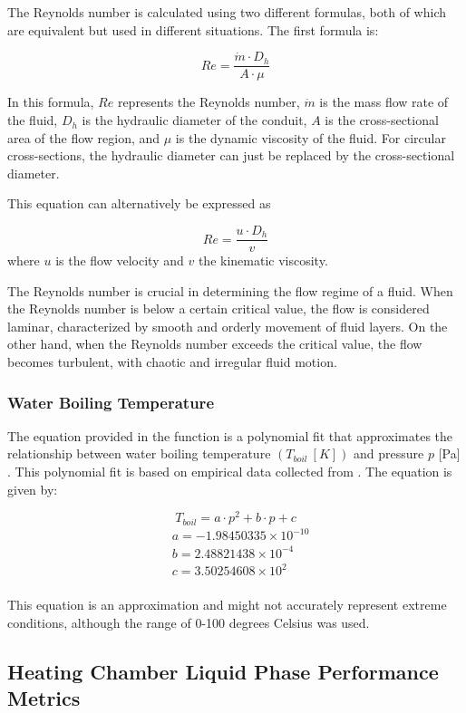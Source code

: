 \documentclass{homework}
\begin{document}
\begin{multicols}{2}
    The Reynolds number is calculated using two different formulas, both of which are equivalent but used in different situations. The first formula is:  
    
    $$
    R e=\frac{\dot{m} \cdot D_h}{A \cdot \mu}
    $$ 		    
    
    In this formula, $Re$ represents the Reynolds number, $\dot{m}$ is the mass flow rate of the fluid, $D_h$ is the hydraulic diameter of the conduit, $A$ is the cross-sectional area of the flow region, and $\mu$ is the dynamic viscosity of the fluid. For circular cross-sections, the hydraulic diameter can just be replaced by the cross-sectional diameter.  
    
    This equation can alternatively be expressed as   
    
    $$R e=\frac{ u \cdot D_h}{v}$$ 		    
    where $u$ is the flow velocity and $v$ the kinematic viscosity.  
    
    The Reynolds number is crucial in determining the flow regime of a fluid. When the Reynolds number is below a certain critical value, the flow is considered laminar, characterized by smooth and orderly movement of fluid layers. On the other hand, when the Reynolds number exceeds the critical value, the flow becomes turbulent, with chaotic and irregular fluid motion.  
\subsubsection{Water Boiling Temperature}
    
    The equation provided in the function is a polynomial fit that approximates the relationship between water boiling temperature $\left(T_{boil} \ [K]\right)$ and pressure $p$ [Pa] . This polynomial fit is based on empirical data collected from \cite{EngineeringToolBox__boiling}. The equation is given by:  

    $$
    T_{boil} = a \cdot p^2 + b \cdot p + c
    $$ 		    
    $$
    \begin{aligned}
    & a=-1.98450335 \times 10^{-10} \\
    & b=2.48821438 \times 10^{-4} \\
    & c=3.50254608 \times 10^2 \\
    \end{aligned}
    $$ 	

    This equation is an approximation and might not accurately represent extreme conditions, although the range of 0-100 degrees Celsius was used.  
    \subsection{Heating Chamber Liquid Phase Performance Metrics}
    

\end{multicols}
\end{document}

